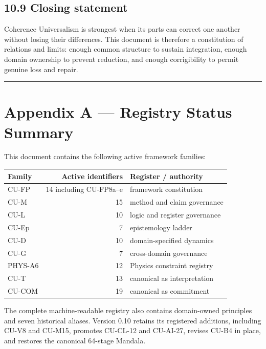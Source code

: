 \documentclass[
  11pt,
]{article}
\begin{document}
\subsection{10.9 Closing statement}\label{closing-statement}

Coherence Universalism is strongest when its parts can correct one
another without losing their differences. This document is therefore a
constitution of relations and limits: enough common structure to sustain
integration, enough domain ownership to prevent reduction, and enough
corrigibility to permit genuine loss and repair.

\begin{center}\rule{0.5\linewidth}{0.5pt}\end{center}

\section{Appendix A --- Registry Status
Summary}\label{appendix-a-registry-status-summary}

This document contains the following active framework families:

\begin{longtable}[]{@{}lrl@{}}
\toprule\noalign{}
Family & Active identifiers & Register / authority \\
\midrule\noalign{}
\endhead
\bottomrule\noalign{}
\endlastfoot
CU-FP & 14 including CU-FP8a--e & framework constitution \\
CU-M & 15 & method and claim governance \\
CU-L & 10 & logic and register governance \\
CU-Ep & 7 & epistemology ladder \\
CU-D & 10 & domain-specified dynamics \\
CU-G & 7 & cross-domain governance \\
PHYS-A6 & 12 & Physics constraint registry \\
CU-T & 13 & canonical as interpretation \\
CU-COM & 19 & canonical as commitment \\
\end{longtable}

The complete machine-readable registry also contains domain-owned
principles and seven historical aliases. Version 0.10 retains its
registered additions, including CU-V8 and CU-M15, promotes CU-CL-12 and
CU-AI-27, revises CU-B4 in place, and restores the canonical 64-stage
Mandala.
\end{document}
